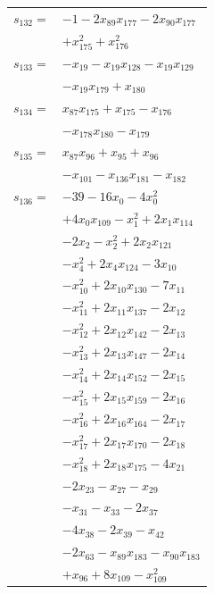 \begin{longtable}{@{}r@{\;}l@{}}
\(s_{132}=\) & \(\displaystyle -1 -2x_{89}x_{177} -2x_{90}x_{177}\) \\
 & \(\displaystyle +x_{175}^{2} +x_{176}^{2}\) \\[3pt]
\(s_{133}=\) & \(\displaystyle -x_{19} -x_{19}x_{128} -x_{19}x_{129}\) \\
 & \(\displaystyle -x_{19}x_{179} +x_{180}\) \\[3pt]
\(s_{134}=\) & \(\displaystyle x_{87}x_{175} +x_{175} -x_{176}\) \\
 & \(\displaystyle -x_{178}x_{180} -x_{179}\) \\[3pt]
\(s_{135}=\) & \(\displaystyle x_{87}x_{96} +x_{95} +x_{96}\) \\
 & \(\displaystyle -x_{101} -x_{136}x_{181} -x_{182}\) \\[3pt]
\(s_{136}=\) & \(\displaystyle -39 -16x_{0} -4x_{0}^{2}\) \\
 & \(\displaystyle +4x_{0}x_{109} -x_{1}^{2} +2x_{1}x_{114}\) \\
 & \(\displaystyle -2x_{2} -x_{2}^{2} +2x_{2}x_{121}\) \\
 & \(\displaystyle -x_{4}^{2} +2x_{4}x_{124} -3x_{10}\) \\
 & \(\displaystyle -x_{10}^{2} +2x_{10}x_{130} -7x_{11}\) \\
 & \(\displaystyle -x_{11}^{2} +2x_{11}x_{137} -2x_{12}\) \\
 & \(\displaystyle -x_{12}^{2} +2x_{12}x_{142} -2x_{13}\) \\
 & \(\displaystyle -x_{13}^{2} +2x_{13}x_{147} -2x_{14}\) \\
 & \(\displaystyle -x_{14}^{2} +2x_{14}x_{152} -2x_{15}\) \\
 & \(\displaystyle -x_{15}^{2} +2x_{15}x_{159} -2x_{16}\) \\
 & \(\displaystyle -x_{16}^{2} +2x_{16}x_{164} -2x_{17}\) \\
 & \(\displaystyle -x_{17}^{2} +2x_{17}x_{170} -2x_{18}\) \\
 & \(\displaystyle -x_{18}^{2} +2x_{18}x_{175} -4x_{21}\) \\
 & \(\displaystyle -2x_{23} -x_{27} -x_{29}\) \\
 & \(\displaystyle -x_{31} -x_{33} -2x_{37}\) \\
 & \(\displaystyle -4x_{38} -2x_{39} -x_{42}\) \\
 & \(\displaystyle -2x_{63} -x_{89}x_{183} -x_{90}x_{183}\) \\
 & \(\displaystyle +x_{96} +8x_{109} -x_{109}^{2}\) \\

\end{longtable}

